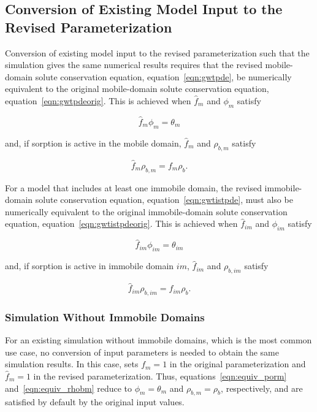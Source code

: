 \subsection{Conversion of Existing Model Input to the Revised Parameterization} \label{sec:inputconversion}

Conversion of existing \mf model input to the revised parameterization such that the simulation gives the same numerical results requires that the revised mobile-domain solute conservation equation, equation~\ref{eqn:gwtpde}, be numerically equivalent to the original mobile-domain solute conservation equation, equation~\ref{eqn:gwtpdeorig}. This is achieved when $\hat{f}_{m}$ and $\phi_{m}$ satisfy

\begin{equation}
\label{eqn:equiv_porm}
\hat{f}_{m} \phi_{m} = \theta_{m}
\end{equation}

\noindent and, if sorption is active in the mobile domain, $\hat{f}_{m}$ and $\rho_{b, m}$ satisfy

\begin{equation}
\label{eqn:equiv_rhobm}
\hat{f}_{m} \rho_{b, m} = f_{m} \rho_{b} .
\end{equation}

\noindent For a model that includes at least one immobile domain, the revised immobile-domain solute conservation equation, equation~\ref{eqn:gwtistpde}, must also be numerically equivalent to the original immobile-domain solute conservation equation, equation~\ref{eqn:gwtistpdeorig}. This is achieved when $\hat{f}_{im}$ and $\phi_{im}$ satisfy

\begin{equation}
\label{eqn:equiv_porim}
\hat{f}_{im} \phi_{im} = \theta_{im}
\end{equation}

\noindent and, if sorption is active in immobile domain $im$, $\hat{f}_{im}$ and $\rho_{b, im}$ satisfy

\begin{equation}
\label{eqn:equiv_rhobim}
\hat{f}_{im} \rho_{b, im} = f_{im} \rho_{b} .
\end{equation}

\subsubsection{Simulation Without Immobile Domains}

For an existing simulation without immobile domains, which is the most common use case, no conversion of input parameters is needed to obtain the same simulation results. In this case, \mf sets $f_{m} = 1$ in the original parameterization and $\hat{f}_{m} = 1$ in the revised parameterization. Thus, equations~\ref{eqn:equiv_porm} and~\ref{eqn:equiv_rhobm} reduce to $\phi_{m} = \theta_{m}$ and $\rho_{b, m} = \rho_{b}$, respectively, and are satisfied by default by the original input values.

